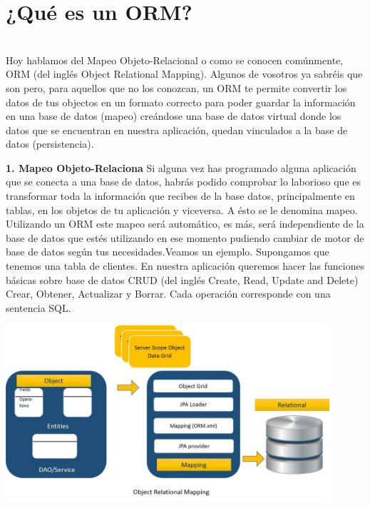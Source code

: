\section{¿Qué es un ORM?} 

\textbf{}\\
Hoy hablamos del Mapeo Objeto-Relacional o como se conocen comúnmente, ORM (del inglés Object Relational Mapping). Algunos de vosotros ya sabréis que son pero, para aquellos que no los conozcan, un ORM te permite convertir los datos de tus objectos en un formato correcto para poder guardar la información en una base de datos (mapeo) creándose una base de datos virtual donde los datos que se encuentran en nuestra aplicación, quedan vinculados a la base de datos (persistencia).

\begin{flushleft}

\begin{center}
	
	\end{center}
\begin{itemize}
\textbf{1.	Mapeo Objeto-Relaciona }
Si alguna vez has programado alguna aplicación que se conecta a una base de datos, habrás podido comprobar lo laborioso que es transformar toda la información que recibes de la base datos, principalmente en tablas, en los objetos de tu aplicación y viceversa. A ésto se le denomina mapeo. Utilizando un ORM este mapeo será automático, es más, será independiente de la base de datos que estés utilizando en ese momento pudiendo cambiar de motor de base de datos según tus necesidades.Veamos un ejemplo. Supongamos que tenemos una tabla de clientes. En nuestra aplicación queremos hacer las funciones básicas sobre base de datos CRUD (del inglés Create, Read, Update and Delete) Crear, Obtener, Actualizar y Borrar. Cada operación corresponde con una sentencia SQL.

\begin{center}
    \includegraphics[width=12cm]{./Imagenes/map01}
    \end{center}



\end{itemize}
\end{flushleft}
